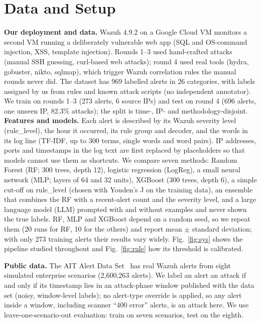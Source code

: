 \documentclass[conference]{IEEEtran}
\begin{document}
\section{Data and Setup}

\textbf{Our deployment and data.} Wazuh 4.9.2 on a Google Cloud VM monitors a second VM running
a deliberately vulnerable web app (SQL and OS-command injection, XSS, template injection). Rounds 1--3 used hand-crafted attacks (manual SSH
guessing, curl-based web attacks); round 4 used real tools (hydra, gobuster,
nikto, sqlmap), which trigger Wazuh correlation rules the manual rounds never
did. The dataset has 969 labelled alerts in 26 categories, with labels assigned by us from rules
and known attack scripts (no independent annotator). We train on rounds 1--3 (273 alerts, 6 source
IPs) and test on round 4 (696 alerts, one unseen IP, 82.3\% attacks); the split is time-, IP- and
methodology-disjoint.
\textbf{Features and models.} Each alert is described by its Wazuh severity level
(rule\_level), the hour it occurred, its rule group and decoder, and the words in its log
line (TF-IDF, up to 300 terms, single words and word pairs). IP addresses, ports and timestamps
in the log text are first replaced by placeholders so that models cannot use them as shortcuts.
We compare seven methods: Random Forest (RF; 300 trees, depth 12), logistic regression (LogReg),
a small neural network (MLP; layers of 64 and 32 units), XGBoost (300 trees, depth 6), a simple
cut-off on rule\_level (chosen with Youden's J on the training data), an ensemble that combines the
RF with a recent-alert count and the severity level, and a large language model (LLM) prompted
with and without examples and never shown the true labels. RF, MLP and XGBoost depend on a random seed, so we repeat them (20 runs for RF, 10 for the others) and report mean $\pm$ standard deviation; with only 273 training alerts
their results vary widely. Fig.~\ref{fig:sys} shows the pipeline studied throughout
and Fig.~\ref{fig:rule} how its threshold is calibrated.


\textbf{Public data.} The AIT Alert Data Set~\cite{ait2023,landauer2024} has real Wazuh alerts
from eight simulated enterprise scenarios (2,600,263 alerts). We label an alert an attack if and
only if its timestamp lies in an attack-phase window published with the data set (noisy, window-level labels); no alert-type override is applied, so any alert inside a window,
including scanner ``400 error'' alerts, is an attack here.
We use leave-one-scenario-out evaluation: train on seven scenarios, test on the eighth.
\end{document}
